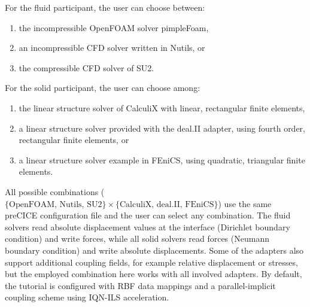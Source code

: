 
For the fluid participant, the user can choose between:
\begin{enumerate}
  \item the incompressible OpenFOAM solver pimpleFoam,
  \item an incompressible CFD solver written in Nutils, or
  \item the compressible CFD solver of SU2.
\end{enumerate}

For the solid participant, the user can choose among:
\begin{enumerate}
  \item the linear structure solver of CalculiX with linear, rectangular finite elements,
  \item a linear structure solver provided with the deal.II adapter, using fourth order, rectangular finite elements, or
  \item a linear structure solver example in FEniCS, using quadratic, triangular finite elements.
\end{enumerate}

All possible combinations ($\{\text{OpenFOAM, Nutils, SU2}\} \times \{\text{CalculiX, deal.II, FEniCS}\}$)
use the same preCICE configuration file and the user can select any combination. The fluid solvers read absolute displacement values at the interface (Dirichlet boundary condition) and write forces, while all solid solvers read forces (Neumann boundary condition) and write absolute displacements.
Some of the adapters also support additional coupling fields, for example relative displacement or stresses, but the employed combination here works with all involved adapters. By default, the tutorial is configured with RBF data mappings and a parallel-implicit coupling scheme using IQN-ILS acceleration.

